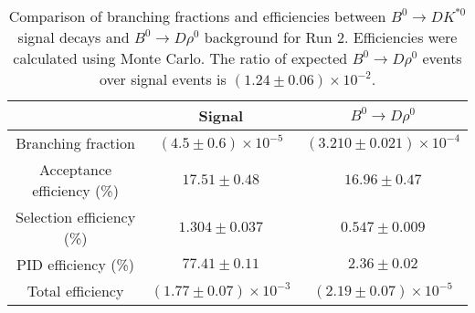 \begin{table}
    \centering
    \begin{tabular}{ccc}
        \toprule
        & Signal & $B^0 \to D\rho^0$ \\
        \midrule
        Branching fraction & $(4.5 \pm 0.6) \times 10^{-5}$ & $(3.210 \pm 0.021) \times 10^{-4}$ \\
        Acceptance efficiency (\%) & $17.51 \pm 0.48$ & $16.96 \pm 0.47$ \\
        Selection efficiency (\%) & $1.304 \pm 0.037$ & $0.547 \pm 0.009$ \\
        PID efficiency (\%) & $77.41 \pm 0.11$ & $2.36 \pm 0.02$ \\
        \midrule
        Total efficiency & $(1.77 \pm 0.07) \times 10^{-3}$ & $(2.19 \pm 0.07) \times 10^{-5}$ \\
        \bottomrule
        \end{tabular}
        \caption{Comparison of branching fractions and efficiencies between $B^0 \to DK^{*0}$ signal decays and $B^0 \to D\rho^0$ background for Run 2. Efficiencies were calculated using Monte Carlo. The ratio of expected $B^0 \to D\rho^0$ events over signal events is $(1.24 \pm 0.06) \times 10^{-2}$.}
\label{tab:rho_efficiency_run2}
\end{table}
